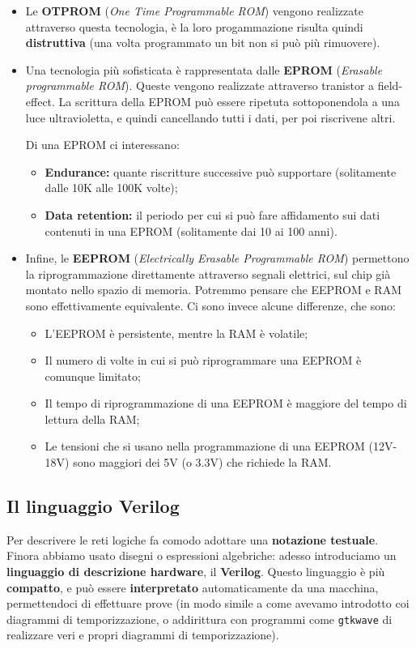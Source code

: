 \documentclass[a4paper,11pt]{article}
\begin{document}
\begin{itemize}
	\item Le \textbf{OTPROM} (\textit{One Time Programmable ROM}) vengono realizzate attraverso questa tecnologia, è la loro progammazione risulta quindi \textbf{distruttiva} (una volta programmato un bit non si può più rimuovere).
	\item  Una tecnologia più sofisticata è rappresentata dalle \textbf{EPROM} (\textit{Erasable programmable ROM}).
Queste vengono realizzate attraverso tranistor a field-effect.
La scrittura della EPROM può essere ripetuta sottoponendola a una luce ultravioletta, e quindi cancellando tutti i dati, per poi riscrivene altri.

Di una EPROM ci interessano:
\begin{itemize}
	\item \textbf{Endurance:} quante riscritture successive può supportare (solitamente dalle 10K alle 100K volte);
	\item \textbf{Data retention:} il periodo per cui si può fare affidamento sui dati contenuti in una EPROM (solitamente dai 10 ai 100 anni).
\end{itemize}
	\item Infine, le \textbf{EEPROM} (\textit{Electrically Erasable Programmable ROM}) permettono la riprogrammazione direttamente attraverso segnali elettrici, sul chip già montato nello spazio di memoria.
		Potremmo pensare che EEPROM e RAM sono effettivamente equivalente.
		Ci sono invece alcune differenze, che sono:
		\begin{itemize}
			\item L'EEPROM è persistente, mentre la RAM è volatile;
			\item Il numero di volte in cui si può riprogrammare una EEPROM è comunque limitato;
			\item Il tempo di riprogrammazione di una EEPROM è maggiore del tempo di lettura della RAM;
			\item Le tensioni che si usano nella programmazione di una EEPROM (12V-18V) sono maggiori dei 5V (o 3.3V) che richiede la RAM. 
		\end{itemize}
\end{itemize}

\subsection{Il linguaggio Verilog}
Per descrivere le reti logiche fa comodo adottare una \textbf{notazione testuale}.
Finora abbiamo usato disegni o espressioni algebriche: adesso introduciamo un \textbf{linguaggio di descrizione hardware}, il \textbf{Verilog}.
Questo linguaggio è più \textbf{compatto}, e può essere \textbf{interpretato} automaticamente da una macchina, permettendoci di effettuare prove (in modo simile a come avevamo introdotto coi diagrammi di temporizzazione, o addirittura con programmi come \lstinline|gtkwave| di realizzare veri e propri diagrammi di temporizzazione).
\end{document}
